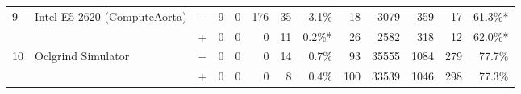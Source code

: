 \begin{tabular}{lll | rrrrr | rrrrr }
\hline
\multirow{ 2}{*}{9} & \multirow{ 2}{*}{Intel E5-2620 (ComputeAorta)} & $-$ & 9 & 0 & 176 & 35 & 3.1\%       & 18 & 3079 & 359 & 17 & 61.3\%* \\& & $+$ & 0 & 0 & 0 & 11 & 0.2\%* & 26 & 2582 & 318 & 12 & 62.0\%* \\
\hline
\multirow{ 2}{*}{10} & \multirow{ 2}{*}{Oclgrind Simulator} & $-$ & 0 & 0 & 0 & 14 & 0.7\%       & 93 & 35555 & 1084 & 279 & 77.7\% \\& & $+$ & 0 & 0 & 0 & 8 & 0.4\% & 100 & 33539 & 1046 & 298 & 77.3\% \\
  \bottomrule
\end{tabular}

